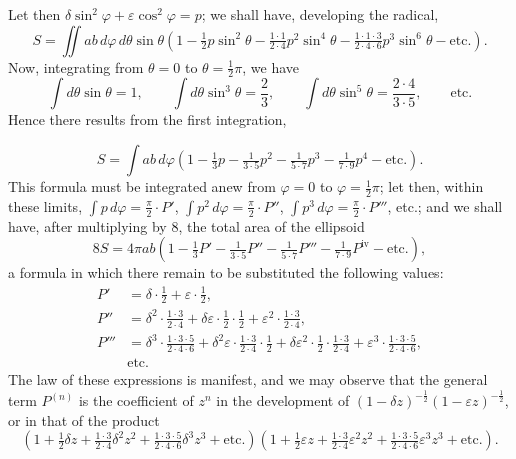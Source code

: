 \documentclass{article}
\begin{document}
Let then $\delta\sin^{2}\varphi+\varepsilon\cos^{2}\varphi=p$; we shall have, developing the radical,
\[ S=\iint ab\,d\varphi\,d\theta\sin\theta\left(1-\tfrac{1}{2}p\sin^{2}\theta-\tfrac{1\cdot1}{2\cdot4}p^{2}\sin^{4}\theta-\tfrac{1\cdot1\cdot3}{2\cdot4\cdot6}p^{3}\sin^{6}\theta-\text{etc.}\right). \]
Now, integrating from $\theta=0$ to $\theta=\frac{1}{2}\pi$, we have
\[ \int d\theta\sin\theta=1,\qquad \int d\theta\sin^{3}\theta=\frac{2}{3},\qquad \int d\theta\sin^{5}\theta=\frac{2\cdot4}{3\cdot5},\qquad \text{etc.} \]
Hence there results from the first integration,

\[ S=\int ab\,d\varphi\left(1-\tfrac{1}{3}p-\tfrac{1}{3\cdot5}p^{2}-\tfrac{1}{5\cdot7}p^{3}-\tfrac{1}{7\cdot9}p^{4}-\text{etc.}\right). \]
This formula must be integrated anew from $\varphi=0$ to $\varphi=\frac{1}{2}\pi$; let then, within these limits, $\displaystyle\int p\,d\varphi=\frac{\pi}{2}\cdot P'$, $\displaystyle\int p^{2}\,d\varphi=\frac{\pi}{2}\cdot P''$, $\displaystyle\int p^{3}\,d\varphi=\frac{\pi}{2}\cdot P'''$, etc.; and we shall have, after multiplying by 8, the total area of the ellipsoid
\[ 8S=4\pi ab\left(1-\tfrac{1}{3}P'-\tfrac{1}{3\cdot5}P''-\tfrac{1}{5\cdot7}P'''-\tfrac{1}{7\cdot9}P^{\text{iv}}-\text{etc.}\right), \]
a formula in which there remain to be substituted the following values:
\[ \begin{aligned} P'&=\delta\cdot\tfrac{1}{2}+\varepsilon\cdot\tfrac{1}{2},\\ P''&=\delta^{2}\cdot\tfrac{1\cdot3}{2\cdot4}+\delta\varepsilon\cdot\tfrac{1}{2}\cdot\tfrac{1}{2}+\varepsilon^{2}\cdot\tfrac{1\cdot3}{2\cdot4},\\ P'''&=\delta^{3}\cdot\tfrac{1\cdot3\cdot5}{2\cdot4\cdot6}+\delta^{2}\varepsilon\cdot\tfrac{1\cdot3}{2\cdot4}\cdot\tfrac{1}{2}+\delta\varepsilon^{2}\cdot\tfrac{1}{2}\cdot\tfrac{1\cdot3}{2\cdot4}+\varepsilon^{3}\cdot\tfrac{1\cdot3\cdot5}{2\cdot4\cdot6},\\ &\text{etc.} \end{aligned} \]
The law of these expressions is manifest, and we may observe that the general term $P^{(n)}$ is the coefficient of $z^{n}$ in the development of $(1-\delta z)^{-\frac{1}{2}}(1-\varepsilon z)^{-\frac{1}{2}}$, or in that of the product
\[ \left(1+\tfrac{1}{2}\delta z+\tfrac{1\cdot3}{2\cdot4}\delta^{2}z^{2}+\tfrac{1\cdot3\cdot5}{2\cdot4\cdot6}\delta^{3}z^{3}+\text{etc.}\right)\left(1+\tfrac{1}{2}\varepsilon z+\tfrac{1\cdot3}{2\cdot4}\varepsilon^{2}z^{2}+\tfrac{1\cdot3\cdot5}{2\cdot4\cdot6}\varepsilon^{3}z^{3}+\text{etc.}\right). \]
\end{document}
